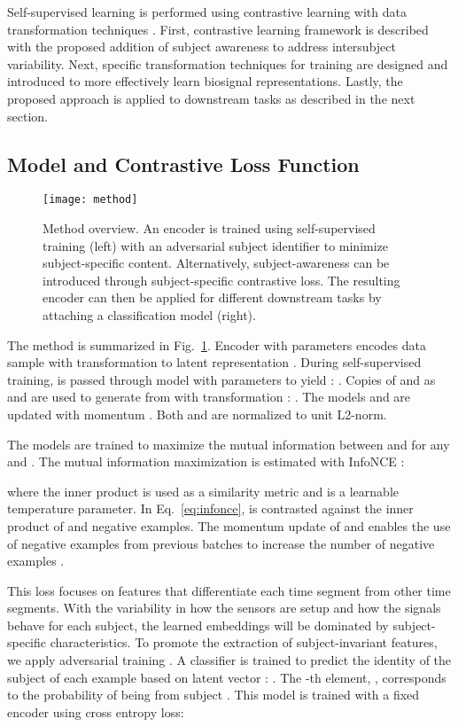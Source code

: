 \documentclass{article}
\begin{document}
Self-supervised learning is performed using contrastive learning with data
transformation techniques
\cite{wu_unsupervised_2018,he_momentum_2019,chen_simple_2020}. First,
contrastive learning framework is described with the proposed addition of
subject awareness to address intersubject variability. Next, specific
transformation techniques for training are designed and introduced to more
effectively learn biosignal representations. Lastly, the proposed approach is
applied to downstream tasks as described in the next section.

\subsection{Model and Contrastive Loss Function}

\begin{figure}
  \centering
  \texttt{[image: method]}
  \caption{Method overview. An encoder  is trained using self-supervised
  training (left) with an adversarial subject identifier to minimize
  subject-specific content. Alternatively, subject-awareness can be introduced
  through subject-specific contrastive loss. The resulting encoder can then be
  applied for different downstream tasks by attaching a classification model
  (right).}
  \label{fig:method}
\end{figure}

The method is summarized in Fig.~\ref{fig:method}. Encoder  with
parameters  encodes data sample  with transformation  to
latent representation . During self-supervised training,  is passed
through model  with parameters  to yield : . Copies of  and  as 
and  are used to generate  from  with transformation : . The models  and  are updated with momentum
\cite{he_momentum_2019}. Both  and  are normalized to unit L2-norm.

The models are trained to maximize the mutual information between  and
 for any  and . The mutual information maximization is
estimated with InfoNCE
\cite{gutmann_noise-contrastive_2010,oord_representation_2019}:

where the inner product  is used as a similarity metric and  is
a learnable temperature parameter. In Eq.~\ref{eq:infonce},  is
contrasted against the inner product of  and  negative examples. The
momentum update of  and  enables the use of negative examples from
previous batches to increase the number of negative examples
\cite{he_momentum_2019}.

This loss focuses on features that differentiate each time segment from other
time segments. With the variability in how the sensors are setup and how the
signals behave for each subject, the learned embeddings will be dominated by
subject-specific characteristics. To promote the extraction of subject-invariant
features, we apply adversarial training \cite{goodfellow_generative_2014,
xie_controllable_2017}. A classifier  is trained to predict the
identity of the subject of each example based on latent vector :
. The -th element,
, corresponds to the probability of  being from
subject . This model is trained with a fixed encoder  using cross entropy
loss:
\end{document}

